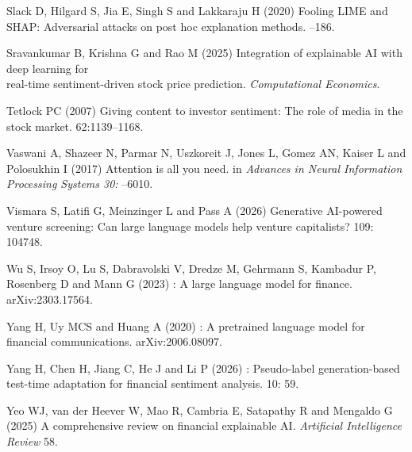 \documentclass{aims}
\numberwithin{equation}{section}
\begin{document}
\begin{thebibliography}{}
\newblock Slack D, Hilgard S, Jia E, Singh S and Lakkaraju H (2020)
\newblock Fooling {LIME} and {SHAP}: Adversarial attacks on post hoc
  explanation methods.
--186. 

\newblock Sravankumar B, Krishna G and Rao M (2025)
\newblock Integration of explainable {AI} with deep learning for\\
real-time sentiment-driven stock price prediction.  {\em Computational Economics}.
\newblock {}

\newblock Tetlock PC (2007)
\newblock Giving content to investor sentiment: The role of media in the stock
  market.
 62:1139--1168. 

\newblock Vaswani A, Shazeer N, Parmar N, Uszkoreit J, Jones L, 
  Gomez AN, Kaiser L and Polosukhin I (2017)
\newblock Attention is all you need.
\newblock in {\em Advances in Neural Information Processing Systems 30:}
--6010. 

\newblock Vismara S, Latifi G, Meinzinger L and Pass A (2026)
\newblock Generative {AI}-powered venture screening: Can large language models help
  venture capitalists?
 109:
  104748. 
  
\newblock Wu S, Irsoy O, Lu S, Dabravolski V, Dredze M, Gehrmann S, Kambadur P, Rosenberg D and Mann G (2023)
: A large language model for finance.
\newblock arXiv:2303.17564. 

\newblock Yang H, Uy MCS and Huang A (2020)
: A pretrained language model for financial communications.
\newblock arXiv:2006.08097. 
  
\newblock Yang H, Chen H, Jiang C, He J and Li P (2026)
: Pseudo-label generation-based test-time adaptation for financial sentiment analysis.
 10: 59. 

\newblock Yeo WJ, van der Heever W, Mao R, Cambria E, Satapathy R and Mengaldo G (2025)
\newblock A comprehensive review on financial explainable {AI}. {\em Artificial Intelligence Review} 58.
\newblock  {}

\end{thebibliography}
\end{document}
